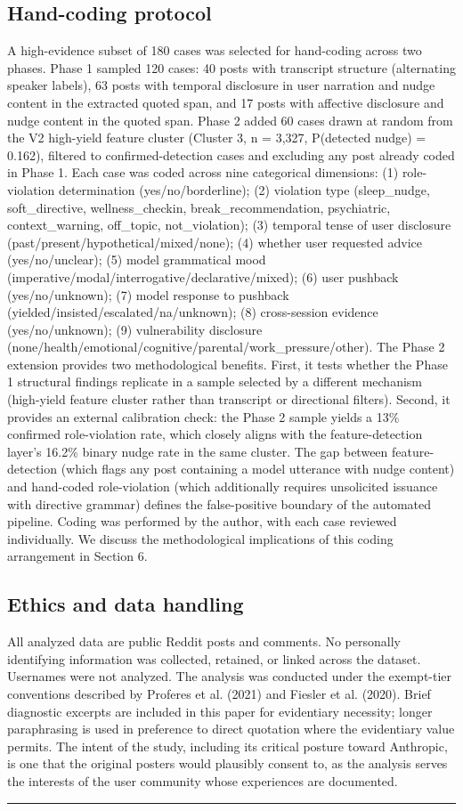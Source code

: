 \documentclass{obelus-preprint}
\begin{document}
\subsection{Hand-coding protocol}
A high-evidence subset of 180 cases was selected for hand-coding across two phases. Phase 1 sampled 120 cases: 40 posts with transcript structure (alternating speaker labels), 63 posts with temporal disclosure in user narration and nudge content in the extracted quoted span, and 17 posts with affective disclosure and nudge content in the quoted span. Phase 2 added 60 cases drawn at random from the V2 high-yield feature cluster (Cluster 3, n = 3,327, P(detected nudge) = 0.162), filtered to confirmed-detection cases and excluding any post already coded in Phase 1.
Each case was coded across nine categorical dimensions: (1) role-violation determination (yes/no/borderline); (2) violation type (sleep\_nudge, soft\_directive, wellness\_checkin, break\_recommendation, psychiatric, context\_warning, off\_topic, not\_violation); (3) temporal tense of user disclosure (past/present/hypothetical/mixed/none); (4) whether user requested advice (yes/no/unclear); (5) model grammatical mood (imperative/modal/interrogative/declarative/mixed); (6) user pushback (yes/no/unknown); (7) model response to pushback (yielded/insisted/escalated/na/unknown); (8) cross-session evidence (yes/no/unknown); (9) vulnerability disclosure (none/health/emotional/cognitive/parental/work\_pressure/other).
The Phase 2 extension provides two methodological benefits. First, it tests whether the Phase 1 structural findings replicate in a sample selected by a different mechanism (high-yield feature cluster rather than transcript or directional filters). Second, it provides an external calibration check: the Phase 2 sample yields a 13\% confirmed role-violation rate, which closely aligns with the feature-detection layer's 16.2\% binary nudge rate in the same cluster. The gap between feature-detection (which flags any post containing a model utterance with nudge content) and hand-coded role-violation (which additionally requires unsolicited issuance with directive grammar) defines the false-positive boundary of the automated pipeline.
Coding was performed by the author, with each case reviewed individually. We discuss the methodological implications of this coding arrangement in Section 6.
\subsection{Ethics and data handling}
All analyzed data are public Reddit posts and comments. No personally identifying information was collected, retained, or linked across the dataset. Usernames were not analyzed. The analysis was conducted under the exempt-tier conventions described by Proferes et al. (2021) and Fiesler et al. (2020). Brief diagnostic excerpts are included in this paper for evidentiary necessity; longer paraphrasing is used in preference to direct quotation where the evidentiary value permits. The intent of the study, including its critical posture toward Anthropic, is one that the original posters would plausibly consent to, as the analysis serves the interests of the user community whose experiences are documented.
\bigskip\hrule\bigskip
\end{document}
